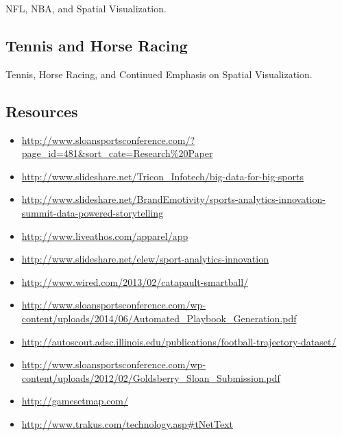 NFL, NBA, and Spatial Visualization.




\subsection{Tennis and Horse Racing}

Tennis, Horse Racing, and Continued Emphasis on Spatial Visualization.



\subsection{Resources}



\begin{itemize}
\item
  \url{http://www.sloansportsconference.com/?page_id=481\&sort_cate=Research\%20Paper}
\item
  \url{http://www.slideshare.net/Tricon_Infotech/big-data-for-big-sports}
\item
  \url{http://www.slideshare.net/BrandEmotivity/sports-analytics-innovation-summit-data-powered-storytelling}
\item
  \url{http://www.liveathos.com/apparel/app}
\item
  \url{http://www.slideshare.net/elew/sport-analytics-innovation}
\item
  \url{http://www.wired.com/2013/02/catapault-smartball/}
\item
  \url{http://www.sloansportsconference.com/wp-content/uploads/2014/06/Automated_Playbook_Generation.pdf}
\item
  \url{http://autoscout.adsc.illinois.edu/publications/football-trajectory-dataset/}
\item
  \url{http://www.sloansportsconference.com/wp-content/uploads/2012/02/Goldsberry_Sloan_Submission.pdf}
\item
  \url{http://gamesetmap.com/}
\item
  \url{http://www.trakus.com/technology.asp\#tNetText}
\end{itemize}


